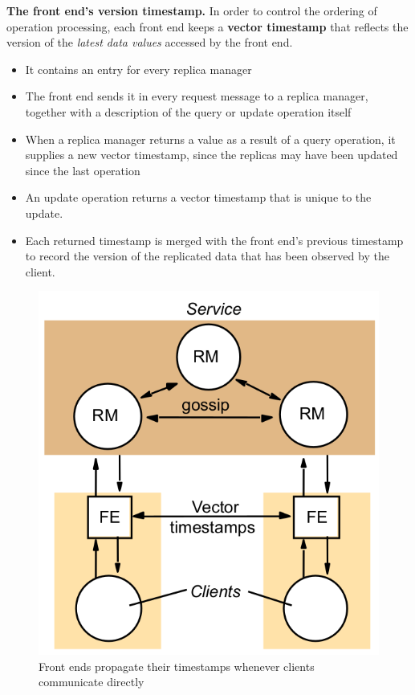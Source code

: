 \textbf{The front end’s version timestamp.} In order to control the ordering of operation processing, each front end keeps a \textbf{vector timestamp} that reflects the version of the \textit{latest data values} accessed by the front end.
\begin{itemize}
    \item It contains an entry for every replica manager
    \item The front end sends it in every request message to a replica manager, together with a description of the query or update operation itself
    \item When a replica manager returns a value as a result of a query operation, it supplies a new vector timestamp, since the replicas may have been updated since the last operation
    \item An update operation returns a vector timestamp that is unique to the update.
    \item Each returned timestamp is merged with the front end’s previous timestamp to record the version of the replicated data that has been observed by the client.
\end{itemize}

\begin{figure}[!h]
    \centering
    \includegraphics[width=.60\linewidth]{images/roleGroupCommunication/GossipArchitectureTimestamp.png}
    \caption{Front ends propagate their timestamps whenever clients communicate directly}
\end{figure}


